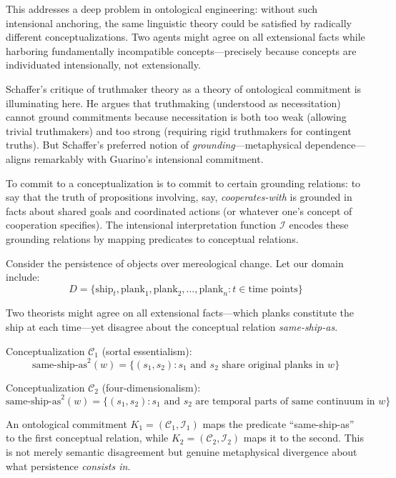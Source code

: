 This addresses a deep problem in ontological engineering: without such intensional anchoring, the same linguistic theory could be satisfied by radically different conceptualizations. Two agents might agree on all extensional facts while harboring fundamentally incompatible concepts—precisely because concepts are individuated intensionally, not extensionally.

Schaffer's critique of truthmaker theory as a theory of ontological commitment \cite{Schaffer2008} is illuminating here. He argues that truthmaking (understood as necessitation) cannot ground commitments because necessitation is both too weak (allowing trivial truthmakers) and too strong (requiring rigid truthmakers for contingent truths). But Schaffer's preferred notion of \emph{grounding}—metaphysical dependence—aligns remarkably with Guarino's intensional commitment. 

To commit to a conceptualization is to commit to certain grounding relations: to say that the truth of propositions involving, say, \textit{cooperates-with} is grounded in facts about shared goals and coordinated actions (or whatever one's concept of cooperation specifies). The intensional interpretation function $\mathcal{I}$ encodes these grounding relations by mapping predicates to conceptual relations.

\begin{example}
	Consider the persistence of objects over mereological change. Let our domain include:
	$$D = \{\text{ship}_t, \text{plank}_1, \text{plank}_2, \ldots, \text{plank}_n : t \in \text{time points}\}$$
	
	Two theorists might agree on all extensional facts—which planks constitute the ship at each time—yet disagree about the conceptual relation \textit{same-ship-as}. 
	
	Conceptualization $\mathcal{C}_1$ (sortal essentialism):
	$$\text{same-ship-as}^2(w) = \{(s_1, s_2) : s_1 \text{ and } s_2 \text{ share original planks in } w\}$$
	
	Conceptualization $\mathcal{C}_2$ (four-dimensionalism):
	$$\text{same-ship-as}^2(w) = \{(s_1, s_2) : s_1 \text{ and } s_2 \text{ are temporal parts of same continuum in } w\}$$
	
	An ontological commitment $K_1 = (\mathcal{C}_1, \mathcal{I}_1)$ maps the predicate ``same-ship-as'' to the first conceptual relation, while $K_2 = (\mathcal{C}_2, \mathcal{I}_2)$ maps it to the second. This is not merely semantic disagreement but genuine metaphysical divergence about what persistence \emph{consists in}.
\end{example}